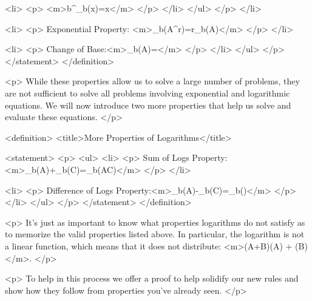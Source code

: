                                    <li>
                                        <p>
                                            <m>b^{\log_b(x)}=x</m>
                                        </p>
                                    </li>
                                </ul>
                            </p>
                        </li>

                        <li>
                            <p>
                                Exponential Property: <m>\log_{b}(A^{r})=r\log_{b}(A)</m>
                            </p>
                        </li>

                        <li>
                            <p>
                                Change of Base:<m>\log_{b}(A)=</m>
                            </p>
                        </li>
                    </ul>
                </p>
            </statement>
        </definition>

        <p>
            While these properties allow us to solve a large number of problems, they are not sufficient to solve all problems involving exponential and logarithmic equations.
            We will now introduce two more properties that help us solve and evaluate these equations.
        </p>

        <definition>
            <title>More Properties of Logarithms</title>

            <statement>
                <p>
                    <ul>
                        <li>
                            <p>
                                Sum of Logs Property:<m>\log_{b}(A)+\log_{b}(C)=\log_{b}(AC)</m>
                            </p>
                        </li>

                        <li>
                            <p>
                                Difference of Logs Property:<m>\log_{b}(A)-\log_{b}(C)=\log_{b}()</m>
                            </p>
                        </li>
                    </ul>
                </p>
            </statement>
        </definition>

        <p>
            It’s just as important to know what properties logarithms do not satisfy as to memorize the valid properties listed above.
            In particular, the logarithm is not a linear function, which means that it does not distribute: <m>\log(A+B)\neq \log(A) + \log(B)</m>.
        </p>

        <p>
            To help in this process we offer a proof to help solidify our new rules and show how they follow from properties you’ve already seen.
        </p>

